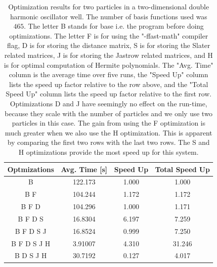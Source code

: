 \documentclass[../main.tex]{subfiles}
\begin{document}
\begin{table}[!ht]
  \centering
  \begin{tabular}{ | c | c | c | c |}
    \hline
    Optmizations & Avg. Time [s] & Speed Up & Total Speed Up\\*
    \hline
    B & 122.173 & 1.000 & 1.000\\*
    \hline
    B F & 104.244 & 1.172 & 1.172\\*
    \hline
    B F D & 104.296 & 1.000 & 1.171\\*
    \hline
    B F D S & 16.8304 & 6.197 & 7.259\\*
    \hline
    B F D S J & 16.8524 & 0.999 & 7.250\\*
    \hline
    B F D S J H & 3.91007 & 4.310 & 31.246\\*
    \hline
    B D S J H & 30.7192 & 0.127 & 4.017\\*
    \hline
  \end{tabular}
  \caption{Optimization results for two particles in a two-dimensional double harmonic oscillator well. The number of basis functions used was $465$. The letter B stands for base i.e. the program before doing optimizations. The letter F is for using the "-ffast-math" compiler flag, D is for storing the distance matrix, S is for storing the Slater related matrices, J is for storing the Jastrow related matrices, and H is for optimal computation of Hermite polynomials. The "Avg. Time" column is the average time over five runs, the "Speed Up" column lists the speed up factor relative to the row above, and the "Total Speed Up" column lists the speed up factor relative to the first row. Optimizations D and J have seemingly no effect on the run-time, because they scale with the number of particles and we only use two particles in this case. The gain from using the F optimization is much greater when we also use the H optimization. This is apparent by comparing the first two rows with the last two rows. The S and H optimizations provide the most speed up for this system.}
  \label{tab: OptimizationExpansion}
\end{table}
\end{document}
